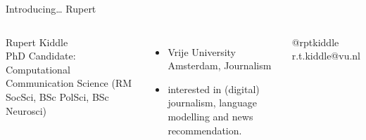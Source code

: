 \documentclass[compress]{beamer}
\begin{document}
\begin{frame}{Introducing\ldots} {\huge{Rupert}} \small{} 

\begin{columns}
	Rupert Kiddle\\
	PhD Candidate: Computational Communication Science (RM SocSci, BSc PolSci, BSc Neurosci)\\
	\begin{itemize}
		\item Vrije University Amsterdam, Journalism
  \item interested in (digital) journalism, language modelling and news recommendation.
	\end{itemize}
	@rptkiddle \textbar r.t.kiddle@vu.nl 
\end{columns}
\end{frame}
\end{document}
